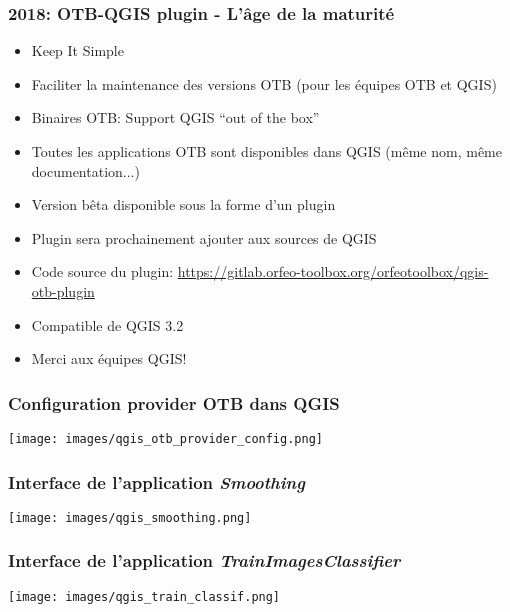 \begin{frame}
  \frametitle{2018: OTB-QGIS plugin - L'âge de la maturité}
  \begin{itemize}
  \item Keep It Simple
  \item Faciliter la maintenance des versions OTB (pour les équipes OTB et QGIS)
  \item Binaires OTB: Support QGIS ``out of the box''
  \item Toutes les applications OTB sont disponibles dans QGIS (même nom, même documentation...)  
  \item \alert{Version bêta} disponible sous la forme d'un plugin
  \item Plugin sera prochainement ajouter aux sources de QGIS
  \item
    Code source du plugin: \url{https://gitlab.orfeo-toolbox.org/orfeotoolbox/qgis-otb-plugin}
  \item Compatible de QGIS 3.2
  \item Merci aux équipes QGIS!
  \end{itemize}
\end{frame}

\begin{frame}
\frametitle{Configuration provider OTB dans QGIS}
\begin{center}
\texttt{[image: images/qgis\_otb\_provider\_config.png]}
\end{center} 
\end{frame}

\begin{frame}
\frametitle{Interface de l'application \textit{Smoothing}}
\begin{center}
\texttt{[image: images/qgis\_smoothing.png]}
\end{center} 
\end{frame}

\begin{frame}
\frametitle{Interface de l'application \textit{TrainImagesClassifier}}
\begin{center}
\texttt{[image: images/qgis\_train\_classif.png]}
\end{center} 
\end{frame}
